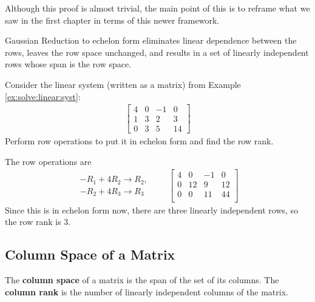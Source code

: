 Although this proof is almost trivial, the main point of this is to reframe what we saw in the first chapter in terms of this newer framework.  


\begin{Boxed*}
Gaussian Reduction to echelon form eliminates linear dependence between the rows, leaves the row space unchanged, and results in a set of linearly independent rows whose span is the row space.  
\end{Boxed*}

\vspace{2in}

\begin{example}
Consider the linear system (written as a matrix) from Example \ref{ex:solve:linear:syst}:
%
\begin{align*}
\begin{bmatrix}
4 & 0 & -1 & 0 \\
1 & 3 & 2 & 3 \\
0 & 3 & 5 & 14 
\end{bmatrix}
\end{align*}
Perform row operations to put it in echelon form and find the row rank. 

\solution

The row operations are 
\begin{align*}
\begin{array}{r}	
-R_1+4R_2 \rightarrow R_2, \\
-R_2 +4R_3 \rightarrow R_3
\end{array}  \qquad
\begin{bmatrix}
4 & 0 & -1 & 0\\
0 & 12 & 9 & 12\\
0 & 0 & 11 & 44\\
\end{bmatrix}
\end{align*}
Since this is in echelon form now, there are three linearly independent rows, so the row rank is 3. 
\end{example}


\subsection{Column Space of a Matrix}

\begin{definition}
The \textbf{column space} of a matrix is the span of the set of its columns.  The \textbf{column rank} is the number of linearly independent columns of the matrix.  
\end{definition}

